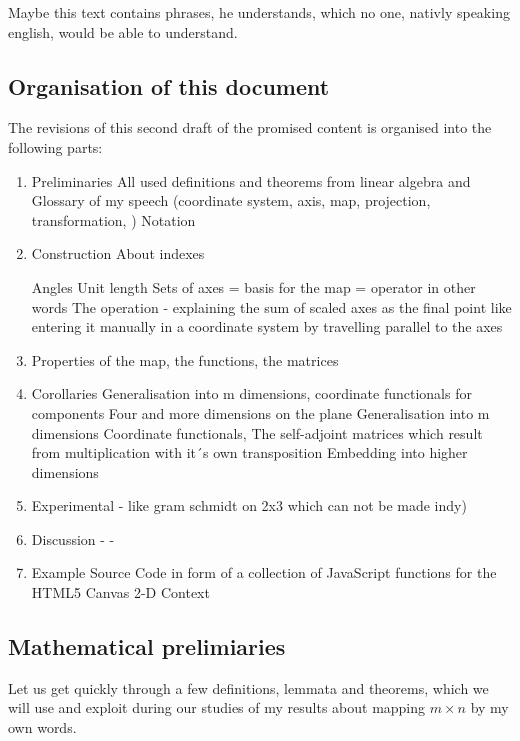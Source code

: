 \documentclass[a4paper]{article}
\begin{document}
Maybe this text contains phrases, he understands, which no one, nativly speaking english, would be able to understand.\\


\subsection{Organisation of this document}

The revisions of this second draft of the promised content is organised into the following parts:

\begin{enumerate}
	\item Preliminaries
		All used definitions and theorems from linear algebra and 
		Glossary of my speech (coordinate system, axis, map, projection, transformation, )
		Notation

	\item Construction 
		About indexes
		
		Angles
		Unit length
		Sets of axes = basis for the map = operator in other words
		The operation
		- explaining the sum of scaled axes as the final point like entering it manually in a coordinate system by travelling parallel to the axes 

	\item Properties of the map, the functions, the matrices
	\item Corollaries Generalisation into m dimensions, coordinate functionals for components
		Four and more dimensions on the plane
		Generalisation into m dimensions
		Coordinate functionals,
		The self-adjoint matrices which result from multiplication with it´s own transposition
		Embedding into higher dimensions
	
	\item Experimental 
		- like gram schmidt on 2x3 which can not be made indy)

	\item Discussion
		- 
		-

	\item Example Source Code in form of a collection of JavaScript functions for the HTML5 Canvas 2-D Context
\end{enumerate}


\subsection{Mathematical prelimiaries}

Let us get quickly through a few definitions, lemmata and theorems, which we will use and exploit during our studies of my results about mapping $m \times n$ by my own words.
\end{document}
